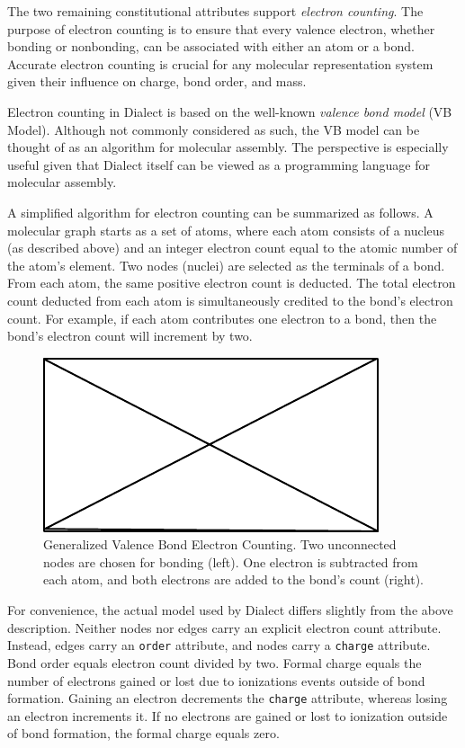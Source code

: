 \documentclass{article}
\def\ttt{\texttt}
\begin{document}
The two remaining constitutional attributes support \textit{electron counting}. The purpose of electron counting is to ensure that every valence electron, whether bonding or nonbonding, can be associated with either an atom or a bond. Accurate electron counting is crucial for any molecular representation system given their influence on charge, bond order, and mass.

Electron counting in Dialect is based on the well-known \textit{valence bond model} (VB Model).\cite{lewis1916} Although not commonly considered as such, the VB model can be thought of as an algorithm for molecular assembly. The perspective is especially useful given that Dialect itself can be viewed as a programming language for molecular assembly.

A simplified algorithm for electron counting can be summarized as follows. A molecular graph starts as a set of atoms, where each atom consists of a nucleus (as described above) and an integer electron count equal to the atomic number of the atom's element. Two nodes (nuclei) are selected as the terminals of a bond. From each atom, the same positive electron count is deducted. The total electron count deducted from each atom is simultaneously credited to the bond's electron count. For example, if each atom contributes one electron to a bond, then the bond's electron count will increment by two.

\begin{figure}
    \centering
    \includegraphics{filler}
    \caption{Generalized Valence Bond Electron Counting. Two unconnected nodes are chosen for bonding (left). One electron is subtracted from each atom, and both electrons are added to the bond's count (right).}
    \label{fig:electron-counting}
\end{figure}

For convenience, the actual model used by Dialect differs slightly from the above description. Neither nodes nor edges carry an explicit electron count attribute. Instead, edges carry an \ttt{order} attribute, and nodes carry a \ttt{charge} attribute. Bond order equals electron count divided by two. Formal charge equals the number of electrons gained or lost due to ionizations events outside of bond formation. Gaining an electron decrements the \ttt{charge} attribute, whereas losing an electron increments it. If no electrons are gained or lost to ionization outside of bond formation, the formal charge equals zero. 
\end{document}
